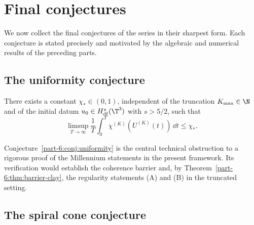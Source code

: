 \section{Final conjectures}
\label{part-6:sec:final-conjectures}

We now collect the final conjectures of the series in their sharpest 
form. Each conjecture is stated precisely and motivated by the 
algebraic and numerical results of the preceding parts.

\subsection{The uniformity conjecture}
\label{part-6:ssec:uniformity-conj}

\begin{conjecture}\label{part-6:conj:uniformity}
There exists a constant $\chi_\ast\in(0,1)$, independent of the 
truncation $K_{\max}\in\N$ and of the initial datum 
$u_0\in H^s_{\mathrm{df}}(\T^3)$ with $s>5/2$, such that
\begin{equation}\label{part-6:eq:uniformity-conj}
\limsup_{T\to\infty}\frac{1}{T}\int_0^T\chi^{(K)}(U^{(K)}(t))\,\dd t 
\leq \chi_\ast.
\end{equation}
\end{conjecture}

\begin{remark}\label{part-6:rem:central-obstr}
Conjecture~\ref{part-6:conj:uniformity} is the central technical obstruction 
to a rigorous proof of the Millennium statements in the present 
framework. Its verification would establish the coherence barrier 
and, by Theorem~\ref{part-6:thm:barrier-clay}, the regularity statements 
(A) and (B) in the truncated setting.
\end{remark}

\subsection{The spiral cone conjecture}
\label{part-6:ssec:cone-conj-final}

